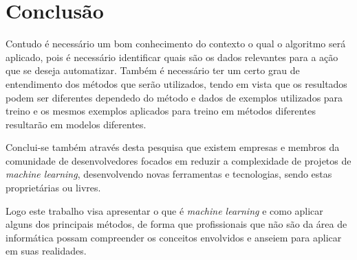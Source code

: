 \chapter{Conclusão}
\label{chap:conclusao}

Contudo é necessário um bom conhecimento do contexto o qual o algoritmo será aplicado, pois é necessário identificar quais são os dados 
relevantes para a ação que se deseja automatizar. Também é necessário ter um certo grau de entendimento dos métodos que serão utilizados, 
tendo em vista que os resultados podem ser diferentes dependedo do método e dados de exemplos utilizados para treino e os mesmos exemplos
aplicados para treino em métodos diferentes resultarão em modelos diferentes.


Conclui-se também através desta pesquisa que existem empresas e membros da comunidade de desenvolvedores focados em reduzir a complexidade
de projetos de \textit{machine learning}, desenvolvendo novas ferramentas e tecnologias, sendo estas proprietárias ou livres.


Logo este trabalho visa apresentar o que é \textit{machine learning} e como aplicar alguns dos principais métodos, de forma que profissionais 
que não são da área de informática possam compreender os conceitos envolvidos e anseiem para aplicar em suas realidades.         

